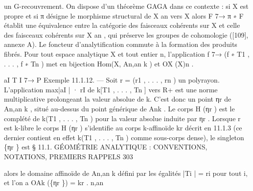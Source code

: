 \documentclass[
  10pt,
]{article}
\newenvironment{Shaded}{}{}
\newcommand{\NormalTok}[1]{#1}
\begin{document}
\begin{Shaded}
\begin{Highlighting}[]
\NormalTok{un G{-}recouvrement.}
\NormalTok{   On dispose d’un théorème GAGA dans ce contexte : si X est propre et si π désigne}
\NormalTok{le morphisme structural de X an vers X alors F 7→ π ∗ F établit une équivalence entre}
\NormalTok{la catégorie des faisceaux cohérents sur X et celle des faisceaux cohérents sur X an , qui}
\NormalTok{préserve les groupes de cohomologie ([109], annexe A).}
\NormalTok{   Le foncteur d’analytification commute à la formation des produits fibrés.}
\NormalTok{   Pour tout espace analytique X et tout entier n, l’application f 7→ (f ∗ T1 , . . . , f ∗ Tn )}
\NormalTok{met en bijection Hom(X, An,an   k  ) et OX (X)n .}

\NormalTok{                                                                                        aI T I 7→}
\NormalTok{                                                                                      P}
\NormalTok{Exemple 11.1.12. — Soit r = (r1 , . . . , rn ) un polyrayon. L’application}
\NormalTok{max|aI | · rI de k[T1 , . . . , Tn ] vers R+ est une norme multiplicative prolongeant la valeur}
\NormalTok{absolue de k. C’est donc un point ηr de An,an     k  , situé au{-}dessus du point générique de Ank .}
\NormalTok{Le corps H (ηr ) est le complété de k(T1 , . . . , Tn ) pour la valeur absolue induite par ηr .}
\NormalTok{  Lorsque r est k{-}libre le corps H (ηr ) s’identifie au corps k{-}affinoïde kr décrit en 11.1.3}
\NormalTok{(ce dernier contient en effet k(T1 , . . . , Tn ) comme sous{-}corps dense), le singleton \{ηr \} est}
\NormalTok{     § 11.1. GÉOMÉTRIE ANALYTIQUE : CONVENTIONS, NOTATIONS, PREMIERS RAPPELS                     303}

\NormalTok{alors le domaine affinoïde de An,an}
\NormalTok{                               k    défini par les égalités |Ti | = ri pour tout i, et l’on a}
\NormalTok{OAk (\{ηr \}) = kr .}
\NormalTok{   n,an}





\end{Highlighting}
\end{Shaded}
\end{document}
